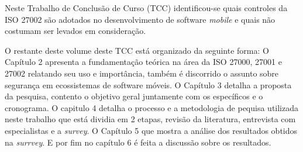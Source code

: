 
Neste Trabalho de Conclusão de Curso (TCC) identificou-se quais controles da ISO 27002 são adotados no desenvolvimento de software \textit{mobile} e quais não costumam ser levados em consideração.


O restante deste volume deste TCC está organizado da seguinte forma: O Capítulo 2 apresenta a fundamentação teórica na área da ISO 27000, 27001 e 27002 relatando seu uso e importância, também é discorrido o assunto sobre segurança em ecossistemas de software móveis. O Capítulo 3 detalha a proposta da pesquisa, contento o objetivo geral juntamente com os específicos e o cronograma. O capitulo 4 detalha o processo e a metodologia de pequisa utilizada neste trabalho que está dividia em 2 etapas, revisão da literatura, entrevista com especialistas e a \textit{survey}. O Capítulo 5 que mostra a análise dos resultados obtidos na \textit{surrvey}. E por fim no capítulo 6 é feita a discussão sobre os resultados.








 

